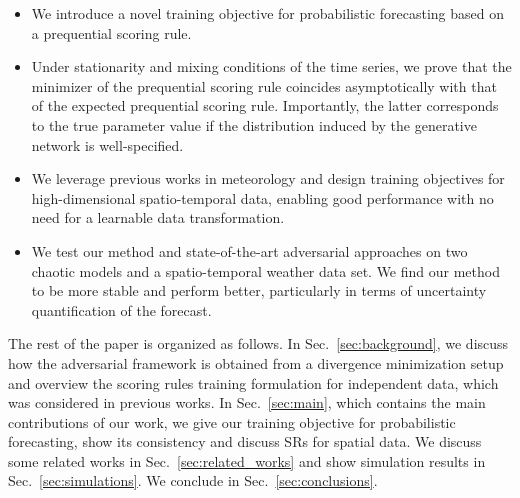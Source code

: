 \documentclass[twoside,11pt]{article}
\begin{document}
	\begin{itemize}
		\item We introduce a novel training objective for probabilistic forecasting based on a {prequential} scoring rule. 	
		\item Under stationarity and mixing conditions of the time series, we prove that the minimizer of the prequential scoring rule coincides asymptotically with that of the expected prequential scoring rule. Importantly, the latter corresponds to the true parameter value if the distribution induced by the generative network is well-specified.
		\item We leverage previous works in meteorology \citep{gneiting2007strictly, scheuerer2015variogram} and design training objectives for high-dimensional spatio-temporal data, enabling good performance with no need for a learnable data transformation.
		\item We test our method and state-of-the-art adversarial approaches on two chaotic models and a spatio-temporal weather data set. We find our method to be more stable and perform better, particularly in terms of uncertainty quantification of the forecast.
	\end{itemize}
	
	
	
	
	The rest of the paper is organized as follows. In Sec.~\ref{sec:background}, we discuss how the adversarial framework is obtained from a divergence minimization setup and overview the scoring rules training formulation for independent data, which was considered in previous works. In Sec.~\ref{sec:main}, which contains the main contributions of our work, we give our training objective for probabilistic forecasting, show its consistency and discuss SRs for spatial data. We discuss some related works in Sec.~\ref{sec:related_works} and show simulation results in Sec.~\ref{sec:simulations}. We conclude in Sec.~\ref{sec:conclusions}.
	
\end{document}
